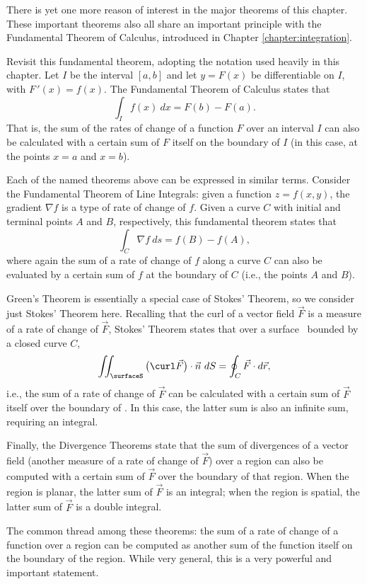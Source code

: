 
There is yet one more reason of interest in the major theorems of this chapter. %
These important theorems also all share an important principle with the Fundamental Theorem of Calculus, introduced in Chapter \ref{chapter:integration}. 

Revisit this fundamental theorem, adopting the notation used heavily in this chapter. Let $I$ be the interval $[a,b]$ and let $y=F(x)$ be differentiable on $I$, with $F\,'(x) = f(x)$. The Fundamental Theorem of Calculus states that 
$$\int_I f(x)\ dx = F(b) - F(a).$$
That is, the sum of the rates of change of a function $F$ over an interval $I$ can also be calculated with a certain sum of $F$ itself on the boundary of $I$ (in this case, at the points $x=a$ and $x=b$).

Each of the named theorems above can be expressed in similar terms. Consider the Fundamental Theorem of Line Integrals: given a function $z=f(x,y)$, the gradient $\nabla f$ is a type of rate of change of $f$. Given a curve $C$ with initial and terminal points $A$ and $B$, respectively, this fundamental theorem states that 
$$\int_C \nabla f\ ds = f(B) - f(A),$$
where again the sum of a rate of change of $f$ along a curve $C$ can also be evaluated by a certain sum of $f$ at the boundary of $C$ (i.e., the points $A$ and $B$).

Green's Theorem is essentially a special case of Stokes' Theorem, so we consider just Stokes' Theorem here. Recalling that the curl of a vector field $\vec F$ is a measure of a rate of change of $\vec F$, Stokes' Theorem states that over a surface \surfaceS\ bounded by a closed curve $C$,
$$\iint_\surfaceS \big(\curl \vec F\big)\cdot \vec n\ dS = \oint_C \vec F\cdot d\vec r,$$
i.e., the sum of a rate of change of $\vec F$ can be calculated with a certain sum of $\vec F$ itself over the boundary of \surfaceS. In this case, the latter sum is also an infinite sum, requiring an integral. 

Finally, the Divergence Theorems state that the sum of divergences of a vector field (another measure of a rate of change of $\vec F$) over a region can also be computed with a certain sum of $\vec F$ over the boundary of that region. When the region is planar, the latter sum of $\vec F$ is an integral; when the region is spatial, the latter sum of $\vec F$ is a double integral.

The common thread among these theorems: the sum of a rate of change of a function over a region can be computed as another sum of the function itself on the boundary of the region. While very general, this is a very powerful and important statement.

